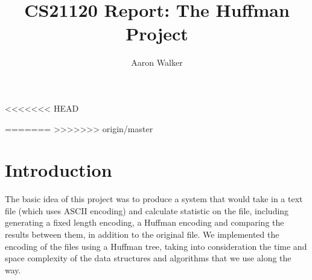 \documentclass[11pt, oneside]{amsart}
\title{CS21120 Report: The Huffman Project}
\author{Aaron Walker}
\begin{document}
\maketitle
<<<<<<< HEAD

=======
>>>>>>> origin/master
\section{Introduction}
The basic idea of this project was to produce a system that would take in a text file (which uses ASCII encoding) and calculate statistic on the file, including generating a fixed length encoding, a Huffman encoding and comparing the results between them, in addition to the original file. We implemented the encoding of the files using a Huffman tree, taking into consideration the time and space complexity of the data structures and algorithms that we use along the way.
\end{document}

